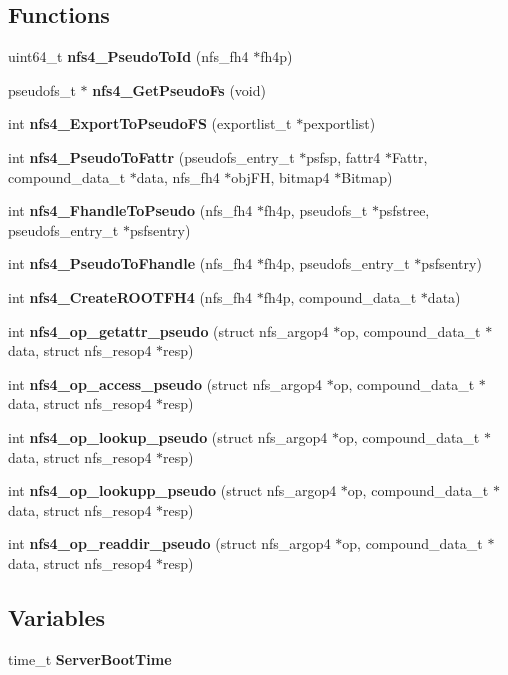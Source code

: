 \subsection*{Functions}
\begin{CompactItemize}
\item 
uint64\_\-t {\bf nfs4\_\-Pseudo\-To\-Id} (nfs\_\-fh4 $\ast$fh4p)
\item 
pseudofs\_\-t $\ast$ {\bf nfs4\_\-Get\-Pseudo\-Fs} (void)
\item 
int {\bf nfs4\_\-Export\-To\-Pseudo\-FS} (exportlist\_\-t $\ast$pexportlist)
\item 
int {\bf nfs4\_\-Pseudo\-To\-Fattr} (pseudofs\_\-entry\_\-t $\ast$psfsp, fattr4 $\ast$Fattr, compound\_\-data\_\-t $\ast$data, nfs\_\-fh4 $\ast$obj\-FH, bitmap4 $\ast$Bitmap)
\item 
int {\bf nfs4\_\-Fhandle\-To\-Pseudo} (nfs\_\-fh4 $\ast$fh4p, pseudofs\_\-t $\ast$psfstree, pseudofs\_\-entry\_\-t $\ast$psfsentry)
\item 
int {\bf nfs4\_\-Pseudo\-To\-Fhandle} (nfs\_\-fh4 $\ast$fh4p, pseudofs\_\-entry\_\-t $\ast$psfsentry)
\item 
int {\bf nfs4\_\-Create\-ROOTFH4} (nfs\_\-fh4 $\ast$fh4p, compound\_\-data\_\-t $\ast$data)
\item 
int {\bf nfs4\_\-op\_\-getattr\_\-pseudo} (struct nfs\_\-argop4 $\ast$op, compound\_\-data\_\-t $\ast$data, struct nfs\_\-resop4 $\ast$resp)
\item 
int {\bf nfs4\_\-op\_\-access\_\-pseudo} (struct nfs\_\-argop4 $\ast$op, compound\_\-data\_\-t $\ast$data, struct nfs\_\-resop4 $\ast$resp)
\item 
int {\bf nfs4\_\-op\_\-lookup\_\-pseudo} (struct nfs\_\-argop4 $\ast$op, compound\_\-data\_\-t $\ast$data, struct nfs\_\-resop4 $\ast$resp)
\item 
int {\bf nfs4\_\-op\_\-lookupp\_\-pseudo} (struct nfs\_\-argop4 $\ast$op, compound\_\-data\_\-t $\ast$data, struct nfs\_\-resop4 $\ast$resp)
\item 
int {\bf nfs4\_\-op\_\-readdir\_\-pseudo} (struct nfs\_\-argop4 $\ast$op, compound\_\-data\_\-t $\ast$data, struct nfs\_\-resop4 $\ast$resp)
\end{CompactItemize}
\subsection*{Variables}
\begin{CompactItemize}
\item 
time\_\-t {\bf Server\-Boot\-Time}
\end{CompactItemize}


